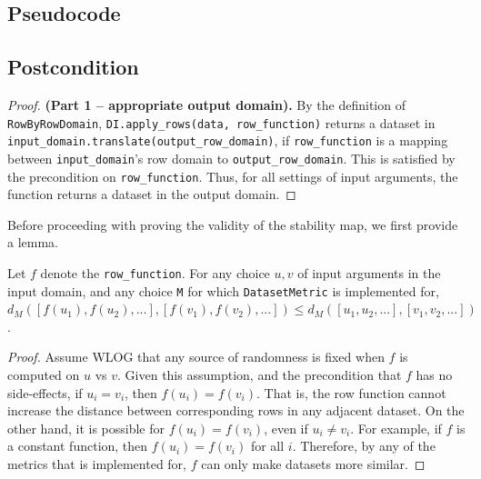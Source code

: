 \documentclass{article}
\begin{document}
\subsection*{Pseudocode}


\subsection*{Postcondition}
\begin{theorem}
\end{theorem}
\begin{proof} \textbf{(Part 1 -- appropriate output domain).}
    By the definition of \texttt{RowByRowDomain}, \texttt{DI.apply\_rows(data, row\_function)} returns a dataset in \texttt{input\_domain.translate(output\_row\_domain)},
    if \texttt{row\_function} is a mapping between \texttt{input\_domain}'s row domain to \texttt{output\_row\_domain}.
    This is satisfied by the precondition on \texttt{row\_function}.
    Thus, for all settings of input arguments, the function returns a dataset in the output domain.
\end{proof}

Before proceeding with proving the validity of the stability map, we first provide a lemma.

\begin{lemma}
    \label{f-sim}
    Let $f$ denote the \texttt{row\_function}.
    For any choice $u, v$ of input arguments in the input domain, and any choice \texttt{M} for which \texttt{DatasetMetric} is implemented for,
    $d_{M}([f(u_1), f(u_2), ...], [f(v_1), f(v_2), ...]) \le d_{M}([u_1, u_2, ...], [v_1, v_2, ...])$.
\end{lemma}

\begin{proof}
    Assume WLOG that any source of randomness is fixed when $f$ is computed on $u$ vs $v$.
    Given this assumption, and the precondition that $f$ has no side-effects,
    if $u_i = v_i$, then $f(u_i) = f(v_i)$.
    That is, the row function cannot increase the distance between corresponding rows in any adjacent dataset.
    On the other hand, it is possible for $f(u_i) = f(v_i)$, even if $u_i \neq v_i$.
    For example, if $f$ is a constant function, then $f(u_i) = f(v_i)$ for all $i$.
    Therefore, by any of the metrics that  is implemented for,
    $f$ can only make datasets more similar.
\end{proof}
\end{document}
